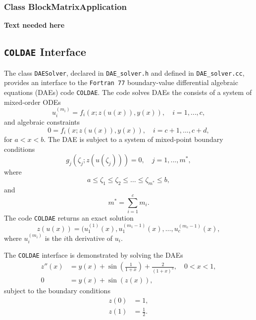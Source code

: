 \subsubsection{Class BlockMatrixApplication}
\textbf{Text needed here}


\subsection{\texttt{COLDAE} Interface}
The class \texttt{DAESolver}, declared in \texttt{DAE\_solver.h} and defined in \texttt{DAE\_solver.cc}, provides an interface to the \texttt{Fortran 77} boundary-value differential algebraic equations (DAEs) code \texttt{COLDAE}.  The code solves DAEs the consists of a system of mixed-order ODEs
\begin{equation*}
  u_{i}^{(m_{i})} =  f_{i} ( x; z(u(x)), y(x) ), \quad    i = 1, ... ,c,
\end{equation*}
and algebraic constraints 
\begin{equation*}
  0   =  f_{i}( x; z(u(x)), y(x) ), \quad   i = c+1,...,c+d,
\end{equation*}
for $a < x < b$.   The DAE is subject to a system of mixed-point boundary conditions
\begin{equation*}
  g_{j}  ( \zeta_{j}; z(u(\zeta_{j})) ) = 0, \quad   j = 1, ... ,m^{*},
\end{equation*}
where 
\begin{equation*}
  a \leq \zeta_{1} \leq \zeta_{2} \leq \dots \leq \zeta_{m^{*}} \leq b,
\end{equation*}
and 
\begin{equation*}
  m^{*} = \sum^{c}_{i=1} m_{i}.
\end{equation*}
The code \texttt{COLDAE} returns an exact solution
\begin{equation*}
  z(u(x)) = ( u_{1}^{(1)}(x), u_{1}^{(m_{1}-1)}(x), \dots, u_{c}^{(m_{c}-1)}(x),
\end{equation*}
where $u_{i}^{(m_{i})}$ is the $i$th derivative of $u_{i}$.

The \texttt{COLDAE} interface is demonstrated by solving the DAEs
\begin{align*}
  z''(x) &= y(x) + \sin \left ( \frac{1}{1+x} \right ) + \frac{2}{(1+x)^{3}}, \quad 0 < x < 1, \\
  0 &= y(x) + \sin (z(x)),
\end{align*}
subject to the boundary conditions 
\begin{align*}
  z(0) &= 1, \\
  z(1) &= \frac{1}{2}.
\end{align*}

